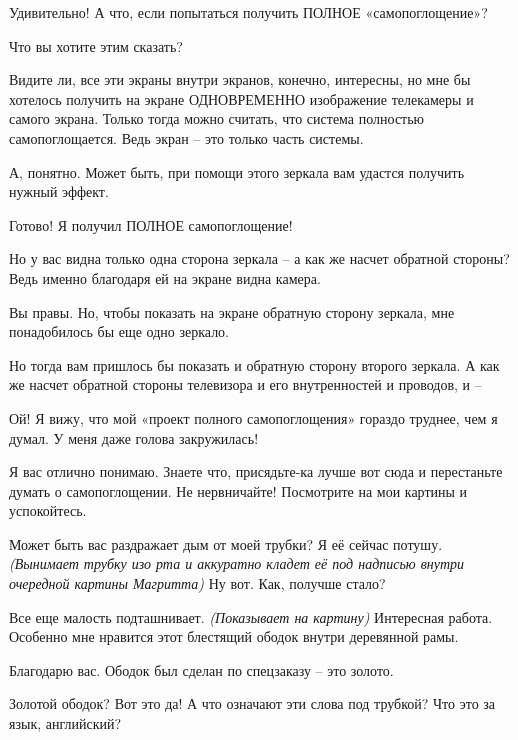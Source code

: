 \documentclass[../main.tex]{subfiles}
\begin{document}
\begin{dialogue}
 Удивительно! А что, если попытаться получить ПОЛНОЕ «самопоглощение»?

 Что вы хотите этим сказать?

 Видите ли, все эти экраны внутри экранов, конечно, интересны, но мне бы хотелось получить на экране ОДНОВРЕМЕННО изображение телекамеры и самого экрана. Только тогда можно считать, что система полностью самопоглощается. Ведь экран \--- это только часть системы.

 А, понятно. Может быть, при помощи этого зеркала вам удастся получить нужный эффект.


 Готово! Я получил ПОЛНОЕ самопоглощение!

 Но у вас видна только одна сторона зеркала \--- а как же насчет обратной стороны? Ведь именно благодаря ей на экране видна камера.

 Вы правы. Но, чтобы показать на экране обратную сторону зеркала, мне понадобилось бы еще одно зеркало.

 Но тогда вам пришлось бы показать и обратную сторону второго зеркала. А как же насчет обратной стороны телевизора и его внутренностей и проводов, и \---

 Ой! Я вижу, что мой «проект полного самопоглощения» гораздо труднее, чем я думал. У меня даже голова закружилась!

 Я вас отлично понимаю. Знаете что, присядьте-ка лучше вот сюда и перестаньте думать о самопоглощении. Не нервничайте! Посмотрите на мои картины и успокойтесь.


Может быть вас раздражает дым от моей трубки? Я её сейчас потушу. \emph{(Вынимает трубку изо рта и аккуратно кладет её под надписью внутри очередной картины Магритта)} Ну вот. Как, получше стало?

 Все еще малость подташнивает. \emph{(Показывает на картину)} Интересная работа. Особенно мне нравится этот блестящий ободок внутри деревянной рамы.

 Благодарю вас. Ободок был сделан по спецзаказу \--- это золото.

 Золотой ободок? Вот это да! А что означают эти слова под трубкой? Что это за язык, английский?


\end{dialogue}
\end{document}
